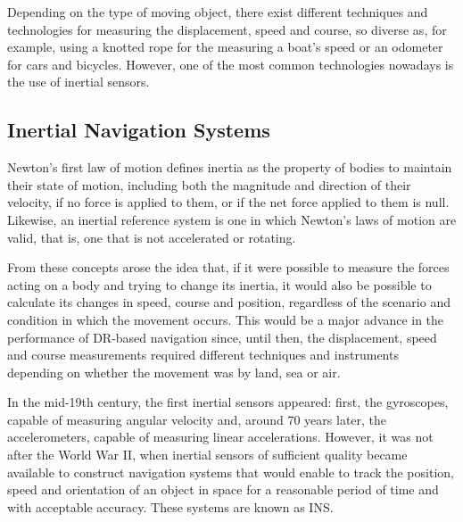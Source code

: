 Depending on the type of moving object, there exist different techniques and technologies for measuring the displacement, speed and course, so diverse as, for example, using a knotted rope for the measuring a boat’s speed  or an odometer for cars and bicycles. 
However, one of the most common technologies nowadays is the use of inertial sensors.
\subsection{Inertial Navigation Systems}
\label{sec:2_3_1_DR_INS}
Newton's first law of motion defines inertia as the property of bodies to maintain their state of motion, including both the magnitude and direction of their velocity, if no force is applied to them, or if the net force applied to them is null.
Likewise, an inertial reference system is one in which Newton's laws of motion are valid, that is, one that is not accelerated or rotating.

From these concepts arose the idea that, if it were possible to measure the forces acting on a body and trying to change its inertia, it would also be possible to calculate its changes in speed, course and position, regardless of the scenario and condition in which the movement occurs. 
This would be a major advance in the performance of DR-based navigation since, until then, the displacement, speed and course measurements required different techniques and instruments depending on whether the movement was by land, sea or air.

In the mid-19th century, the first inertial sensors appeared: first, the gyroscopes, capable of measuring angular velocity and, around 70 years later, the accelerometers, capable of measuring linear accelerations.
However, it was not after the World War II, when inertial sensors of sufficient quality became available to construct navigation systems that would enable to track the position, speed and orientation of an object in space for a reasonable period of time and with acceptable accuracy. These systems are known as INS.

